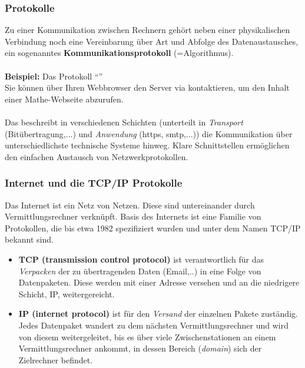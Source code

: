 \subsubsection{Protokolle}
Zu einer Kommunikation zwischen Rechnern gehört neben einer physikalischen Verbindung noch eine Vereinbarung über Art und Abfolge des Datenaustausches, ein sogenanntes \textbf{Kommunikationsprotokoll} (=Algorithmus).\\~\\
\textbf{Beispiel:} Das Protokoll ``''\\Sie können über Ihren Webbrowser den Server  via  kontaktieren, um den Inhalt einer Mathe-Webseite abzurufen.
~\\
~\\
Das  beschreibt in verschiedenen Schichten (unterteilt in \textit{Transport} (Bitübertragung,...) und  \textit{Anwendung} (https, smtp,...)) die Kommunikation über unterschiedlichste technische Systeme hinweg. Klare Schnittstellen ermöglichen den einfachen Austausch von Netzwerkprotokollen.
%
%
\subsubsection{Internet und die TCP/IP Protokolle}
Das Internet ist ein Netz von Netzen. Diese sind untereinander durch Vermittlungsrechner verknüpft. Basis des Internets ist eine Familie von Protokollen, die bis etwa 1982 spezifiziert wurden und unter dem Namen TCP/IP bekannt sind.
\begin{itemize}
	\item \textbf{TCP (transmission control protocol)} ist verantwortlich für das
	\textit{Verpacken} der zu übertragenden Daten (Email,..) in eine Folge von Datenpaketen. Diese werden mit einer Adresse versehen und an die niedrigere Schicht, IP, weitergereicht.
	\item \textbf{IP (internet protocol)} ist für den \textit{Versand} der einzelnen Pakete zuständig. Jedes Datenpaket wandert zu dem nächsten Vermittlungsrechner und wird von diesem weitergeleitet, bis es über viele Zwischenstationen an einem Vermittlungsrechner ankommt, in dessen Bereich (\textit{domain}) sich der Zielrechner befindet.
\end{itemize}


